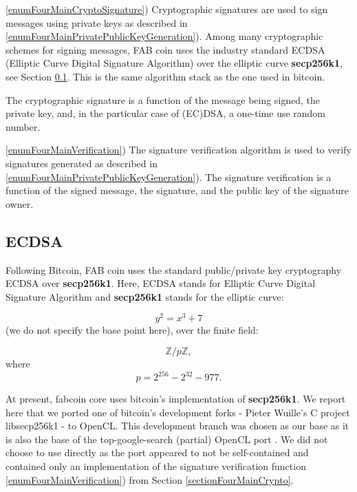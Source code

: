 \documentclass{article}
\newcommand{\secpTwoFiveSixKone}{{\bf secp256k1}}
\begin{document}
\noindent\ref{enumFourMainCryptoSignature}) Cryptographic signatures are used to sign messages using private keys as described in \ref{enumFourMainPrivatePublicKeyGeneration}). Among many cryptographic schemes for signing messages, FAB coin uses the industry standard ECDSA (Elliptic Curve Digital Signature Algorithm) over the elliptic curve \secpTwoFiveSixKone, see Section \ref{sectionECDSAgeneral}. This is the same algorithm stack as the one used in bitcoin.

The cryptographic signature is a function of the message being signed, the private key, and, in the particular case of (EC)DSA, a one-time use random number.

\noindent\ref{enumFourMainVerification}) The signature verification algorithm is used to verify signatures generated as described in \ref{enumFourMainPrivatePublicKeyGeneration}). The signature verification is a function of the signed message, the signature, and the public key of the signature owner.

\subsection{ECDSA}\label{sectionECDSAgeneral}
Following Bitcoin, FAB coin uses the standard public/private key cryptography ECDSA over \secpTwoFiveSixKone. Here, ECDSA stands for Elliptic Curve Digital Signature Algorithm and \secpTwoFiveSixKone{} stands for the elliptic curve:

\[
y^2 = x^3 + 7
\]
(we do not specify the base point here), over the finite field:

\[
\mathbb Z / p\mathbb Z, 
\]
where
\begin{equation}\label{eqThePrime}
p= 2^{256} - 2^{32} - 977.
\end{equation}

At present, fabcoin core uses bitcoin's implementation of \secpTwoFiveSixKone{}. We report here that we ported one of bitcoin's development forks - Pieter Wuille's C project libsecp256k1 \cite{Wuille:secp256k1}  - to OpenCL. This development branch was chosen as our base as it is also the base of the top-google-search (partial) OpenCL port \cite{secp256k1:openCLimplementationHanh0}. We did not choose to use \cite{secp256k1:openCLimplementationHanh0} directly as the port appeared to not be self-contained and contained only an implementation of the signature verification function \ref{enumFourMainVerification})  from Section \ref{sectionFourMainCrypto}.




\end{document}
